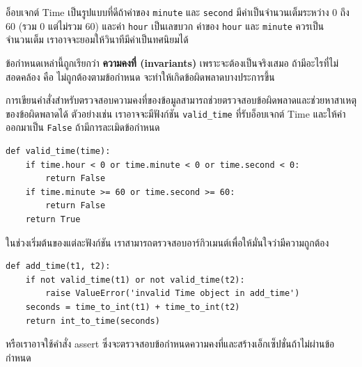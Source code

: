 
อ็อบเจกต์ Time เป็นรูปแบบที่ดีถ้าค่าของ {\tt minute} และ {\tt second} มีค่าเป็นจำนวนเต็มระหว่าง 0 ถึง 60 (รวม 0 แต่ไม่รวม 60) และค่า {\tt hour} เป็นเลขบวก 
ค่าของ {\tt hour} และ {\tt minute} ควรเป็นจำนวนเต็ม เราอาจจะยอมให้วินาทีมีค่าเป็นทศนิยมได้



ข้อกำหนดเหล่านี้ถูกเรียกว่า {\bf ความคงที่ (invariants)} เพราะจะต้องเป็นจริงเสมอ ถ้ามีอะไรที่ไม่สอดคล้อง คือ ไม่ถูกต้องตามข้อกำหนด จะทำให้เกิดข้อผิดพลาดบางประการขึ้น 



การเขียนคำสั่งสำหรับตรวจสอบความคงที่ของข้อมูลสามารถช่วยตรวจสอบข้อผิดพลาดและช่วยหาสาเหตุของข้อผิดพลาดได้ ตัวอย่างเช่น 
เราอาจจะมีฟังก์ชัน \verb"valid_time" ที่รับอ็อบเจกต์ Time และให้ค่าออกมาเป็น {\tt False} ถ้ามีการละเมิดข้อกำหนด


\begin{verbatim}
def valid_time(time):
    if time.hour < 0 or time.minute < 0 or time.second < 0:
        return False
    if time.minute >= 60 or time.second >= 60:
        return False
    return True
\end{verbatim}
%

ในช่วงเริ่มต้นของแต่ละฟังก์ชัน เราสามารถตรวจสอบอาร์กิวเมนต์เพื่อให้มั่นใจว่ามีความถูกต้อง


\begin{verbatim}
def add_time(t1, t2):
    if not valid_time(t1) or not valid_time(t2):
        raise ValueError('invalid Time object in add_time')
    seconds = time_to_int(t1) + time_to_int(t2)
    return int_to_time(seconds)
\end{verbatim}
%
หรือเราอาจใช้คำสั่ง assert ซึ่งจะตรวจสอบข้อกำหนดความคงที่และสร้างเอ็กเซ็ปชั่นถ้าไม่ผ่านข้อกำหนด

